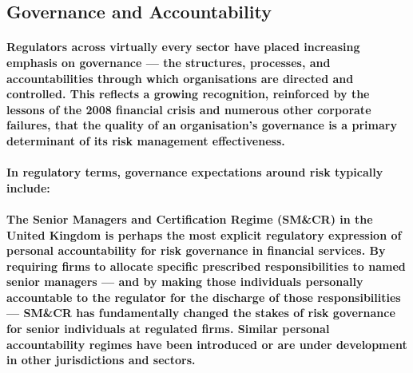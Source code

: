 \subsection{Governance and Accountability}
\paragraph{Regulators across virtually every sector have placed increasing emphasis on \textbf{governance} — the structures, processes, and accountabilities through which organisations are directed and controlled. This reflects a growing recognition, reinforced by the lessons of the 2008 financial crisis and numerous other corporate failures, that the quality of an organisation's governance is a primary determinant of its risk management effectiveness.}
\paragraph{In regulatory terms, governance expectations around risk typically include:}
\begin{itemize}
\end{itemize}
\paragraph{The \textbf{Senior Managers and Certification Regime (SM\&CR)} in the United Kingdom is perhaps the most explicit regulatory expression of personal accountability for risk governance in financial services. By requiring firms to allocate specific prescribed responsibilities to named senior managers — and by making those individuals personally accountable to the regulator for the discharge of those responsibilities — SM\&CR has fundamentally changed the stakes of risk governance for senior individuals at regulated firms. Similar personal accountability regimes have been introduced or are under development in other jurisdictions and sectors.}

